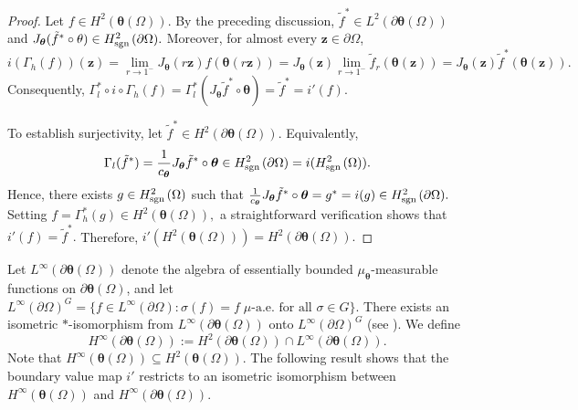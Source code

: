 \documentclass[12pt,reqno]{amsart}
\theoremstyle{remark}
\theoremstyle{definition}
\newcommand{\sgn}{{\rm sgn\,}}
\def \z{\boldsymbol{z}}
\begin{document}
\begin{proof}
Let $f\in H^2(\boldsymbol \theta(\Omega)).$ By the preceding discussion, $\tilde{f}^*\in L^2(\partial\boldsymbol \theta(\Omega))$ and $J_{\boldsymbol \theta}(\tilde{f}^* \circ \theta)\in H_{\sgn}^2(\partial\Omega).$ Moreover, for almost every $\z\in \partial\Omega$, $$i(\Gamma_h(f))(\z)=\lim_{r \to 1^-} J_{\boldsymbol \theta}(r\z) f(\boldsymbol{\theta}(r\z))=J_{\boldsymbol \theta}(\z)\lim_{r\to 1^-} \tilde{f}_r(\boldsymbol{\theta}(\z)) =J_{\boldsymbol \theta}(\z) \tilde{f}^*(\boldsymbol{\theta}(\z)).$$
Consequently, $\Gamma_l^* \circ i \circ \Gamma_h (f)= \Gamma_l^*(J_{\boldsymbol{\theta}} \tilde{f}^* \circ \boldsymbol{\theta})=\tilde{f}^*=i'(f).$

To establish surjectivity, let $\tilde{f}^*\in H^2(\partial\boldsymbol \theta(\Omega)).$  
Equivalently,  $$\Gamma_l(\tilde{f}^*)=\frac{1}{c_{\boldsymbol \theta}} J_{\boldsymbol \theta} \tilde{f}^* \circ \boldsymbol \theta\in H^2_{\sgn}(\partial\Omega)=i(H^2_{\sgn}(\Omega)).$$ Hence, there exists $g\in H^2_{\sgn}(\Omega)$ such that $\frac{1}{c_{\boldsymbol \theta}} J_{\boldsymbol\theta} \tilde{f}^* \circ \boldsymbol\theta=g^*=i(g)\in H^2_{\sgn}(\partial\Omega).$ Setting $f=\Gamma_h^*(g)\in H^2(\boldsymbol \theta(\Omega)),$ a straightforward verification shows that $i'(f)=\tilde{f}^*.$ Therefore, $i'(H^2(\boldsymbol \theta(\Omega)))=H^2(\partial\boldsymbol \theta(\Omega)).$
\end{proof}

Let $L^\infty(\partial\boldsymbol \theta(\Omega))$ denote the algebra of essentially bounded $\mu_{\boldsymbol \theta}$-measurable functions on $\partial\boldsymbol \theta(\Omega)$, and let 
$L^\infty(\partial\Omega)^{G}=\{ f\in L^\infty (\partial\Omega): \sigma(f)=f\;  \mu\text{-a.e. for all } \sigma\in G\}.$ There exists an isometric $*$-isomorphism from $L^\infty(\partial\boldsymbol \theta(\Omega))$ onto $L^\infty(\partial\Omega)^{G}$ (see \cite[Subsection 3.6]{GR2024}). 
We define $$H^\infty(\partial \boldsymbol \theta(\Omega)):=H^2(\partial\boldsymbol \theta(\Omega)) \cap L^\infty(\partial\boldsymbol \theta(\Omega)).$$ Note that $H^\infty(\boldsymbol \theta(\Omega)) \subseteq H^2(\boldsymbol \theta(\Omega)).$ The following result shows that the boundary value map
$i'$ restricts to an isometric isomorphism between $H^\infty(\boldsymbol \theta(\Omega))$ and $H^\infty(\partial\boldsymbol \theta(\Omega)).$
\end{document}
